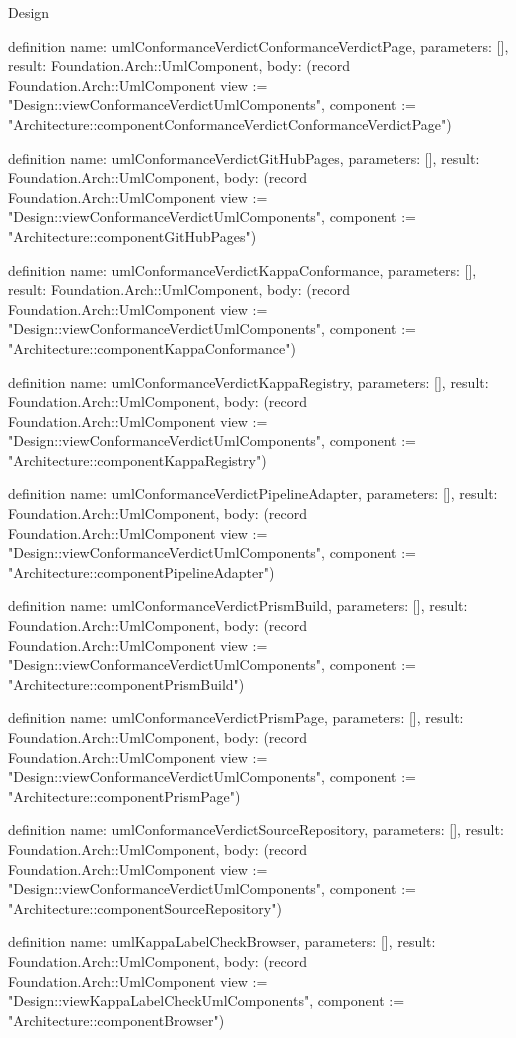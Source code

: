 \begin{lexlean}{Design}
\begin{semanticmodule}
definition{
  name: umlConformanceVerdictConformanceVerdictPage,
  parameters: [],
  result: Foundation.Arch::UmlComponent,
  body: (record Foundation.Arch::UmlComponent {view := "Design::viewConformanceVerdictUmlComponents", component := "Architecture::componentConformanceVerdictConformanceVerdictPage"})
}

definition{
  name: umlConformanceVerdictGitHubPages,
  parameters: [],
  result: Foundation.Arch::UmlComponent,
  body: (record Foundation.Arch::UmlComponent {view := "Design::viewConformanceVerdictUmlComponents", component := "Architecture::componentGitHubPages"})
}

definition{
  name: umlConformanceVerdictKappaConformance,
  parameters: [],
  result: Foundation.Arch::UmlComponent,
  body: (record Foundation.Arch::UmlComponent {view := "Design::viewConformanceVerdictUmlComponents", component := "Architecture::componentKappaConformance"})
}

definition{
  name: umlConformanceVerdictKappaRegistry,
  parameters: [],
  result: Foundation.Arch::UmlComponent,
  body: (record Foundation.Arch::UmlComponent {view := "Design::viewConformanceVerdictUmlComponents", component := "Architecture::componentKappaRegistry"})
}

definition{
  name: umlConformanceVerdictPipelineAdapter,
  parameters: [],
  result: Foundation.Arch::UmlComponent,
  body: (record Foundation.Arch::UmlComponent {view := "Design::viewConformanceVerdictUmlComponents", component := "Architecture::componentPipelineAdapter"})
}

definition{
  name: umlConformanceVerdictPrismBuild,
  parameters: [],
  result: Foundation.Arch::UmlComponent,
  body: (record Foundation.Arch::UmlComponent {view := "Design::viewConformanceVerdictUmlComponents", component := "Architecture::componentPrismBuild"})
}

definition{
  name: umlConformanceVerdictPrismPage,
  parameters: [],
  result: Foundation.Arch::UmlComponent,
  body: (record Foundation.Arch::UmlComponent {view := "Design::viewConformanceVerdictUmlComponents", component := "Architecture::componentPrismPage"})
}

definition{
  name: umlConformanceVerdictSourceRepository,
  parameters: [],
  result: Foundation.Arch::UmlComponent,
  body: (record Foundation.Arch::UmlComponent {view := "Design::viewConformanceVerdictUmlComponents", component := "Architecture::componentSourceRepository"})
}

definition{
  name: umlKappaLabelCheckBrowser,
  parameters: [],
  result: Foundation.Arch::UmlComponent,
  body: (record Foundation.Arch::UmlComponent {view := "Design::viewKappaLabelCheckUmlComponents", component := "Architecture::componentBrowser"})
}


\end{semanticmodule}
\end{lexlean}
